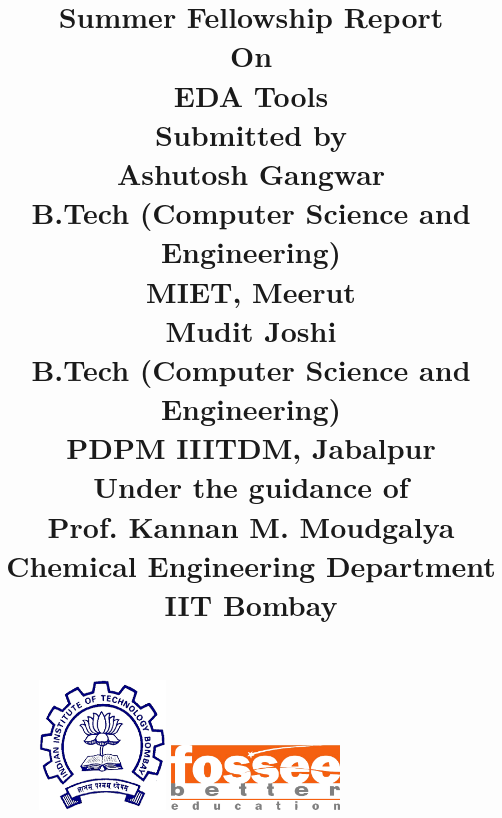 \documentclass[12pt,a4paper]{report}
\begin{document}
\begin{figure}
\centering
\includegraphics[width = 0.3\textwidth]{iit}
\hspace{1cm}
\includegraphics[width = 0.4\textwidth]{fossee-logo.png}
\end{figure}

\title{\textbf{\textbf{Summer Fellowship Report}}\vspace{4mm} \\\small On \\\vspace{4mm} \textbf{\large EDA Tools}\\ \vspace{4mm}\small Submitted by\\  \vspace{4mm}  \large \textbf{Ashutosh Gangwar}\\ \vspace{1mm} B.Tech (Computer Science and Engineering)\\ MIET, Meerut\\ \vspace{4mm} \large \textbf{Mudit Joshi}\\ \vspace{1mm} B.Tech (Computer Science and Engineering)\\ PDPM IIITDM, Jabalpur\\ \vspace{4mm} \small Under the guidance of \\ \vspace{4mm}
	\large \textbf{Prof. Kannan M. Moudgalya} \vspace{1mm}\\ Chemical Engineering Department  \vspace{1mm} \\IIT Bombay
}

\maketitle
\end{document}
